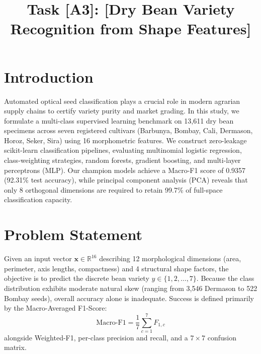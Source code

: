 \documentclass[conference]{IEEEtran}
\begin{document}
\title{Task [A3]: [Dry Bean Variety Recognition from Shape Features]}

\author{
}

\maketitle

\section{Introduction}
Automated optical seed classification plays a crucial role in modern agrarian supply chains to certify variety purity and market grading. In this study, we formulate a multi-class supervised learning benchmark on 13,611 dry bean specimens across seven registered cultivars (Barbunya, Bombay, Cali, Dermason, Horoz, Seker, Sira) using 16 morphometric features. We construct zero-leakage scikit-learn classification pipelines, evaluating multinomial logistic regression, class-weighting strategies, random forests, gradient boosting, and multi-layer perceptrons (MLP). Our champion models achieve a Macro-F1 score of 0.9357 (92.31\% test accuracy), while principal component analysis (PCA) reveals that only 8 orthogonal dimensions are required to retain 99.7\% of full-space classification capacity.

\section{Problem Statement}
Given an input vector $\mathbf{x} \in \mathbb{R}^{16}$ describing 12 morphological dimensions (area, perimeter, axis lengths, compactness) and 4 structural shape factors, the objective is to predict the discrete bean variety $y \in \{1, 2, \dots, 7\}$. Because the class distribution exhibits moderate natural skew (ranging from 3,546 Dermason to 522 Bombay seeds), overall accuracy alone is inadequate. Success is defined primarily by the Macro-Averaged F1-Score:
\begin{equation}
\text{Macro-F1} = \frac{1}{7} \sum_{c=1}^7 F_{1,c}
\end{equation}
alongside Weighted-F1, per-class precision and recall, and a $7 \times 7$ confusion matrix.
\end{document}
